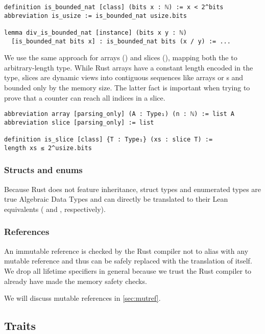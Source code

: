\begin{verbatim}
definition is_bounded_nat [class] (bits x : ℕ) := x < 2^bits
abbreviation is_usize := is_bounded_nat usize.bits

lemma div_is_bounded_nat [instance] (bits x y : ℕ)
  [is_bounded_nat bits x] : is_bounded_nat bits (x / y) := ...
\end{verbatim}

We use the same approach for arrays (\rust{[T; N]}) and slices (\rust{&[T]}),
mapping both the to arbitrary-length  type. While Rust arrays have a
constant length encoded in the type, slices are dynamic views into contiguous sequences
like arrays or s and bounded only by the memory size. The latter fact is important
when trying to prove that a  counter can reach all indices in a slice.

\begin{verbatim}
abbreviation array [parsing_only] (A : Type₁) (n : ℕ) := list A
abbreviation slice [parsing_only] := list

definition is_slice [class] {T : Type₁} (xs : slice T) :=
length xs ≤ 2^usize.bits
\end{verbatim}

\subsubsection{Structs and enums}

Because Rust does not feature inheritance, struct types and enumerated types are
true Algebraic Data Types and can directly be translated to their Lean
equivalents ( and , respectively).

\subsubsection{References}

An immutable reference  is checked by the Rust compiler not to alias
with any mutable reference and thus can be safely replaced with the translation
of  itself. We drop all lifetime specifiers in general because we trust
the Rust compiler to already have made the memory safety checks.

We will discuss mutable references in \autoref{sec:mutref}.

\subsection{Traits}

